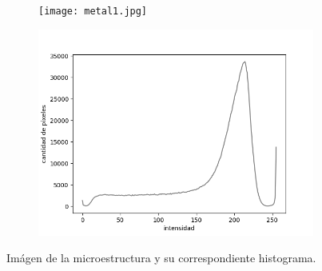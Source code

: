 \documentclass[12pt,twocolumn]{article}
\begin{document}
\begin{figure}[H]
       \centering
       \begin{subfigure}[b]{0.4\linewidth}
           \texttt{[image: metal1.jpg]}
           \label{fig:westminster_lateral}
        \end{subfigure}

        \begin{subfigure}[b]{0.6\linewidth}
            \includegraphics[width=\linewidth]{histograma1.png}
            \label{fig:westminster_lateral}
         \end{subfigure}
         \caption{Im\'agen de la microestructura y su correspondiente histograma\cite{metal2}.}
\end{figure}
\end{document}
